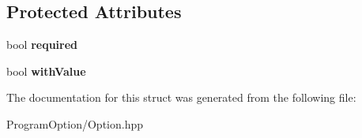 \subsection*{Protected Attributes}
\begin{DoxyCompactItemize}
\item 
\mbox{\label{structts_1_1_option_a37a2229e1048b8f8f2acc9f72990f00f}} 
bool {\bfseries required}
\item 
\mbox{\label{structts_1_1_option_affdb2491c28f14eaf43c50b2f674a676}} 
bool {\bfseries with\+Value}
\end{DoxyCompactItemize}


The documentation for this struct was generated from the following file\+:\begin{DoxyCompactItemize}
\item 
Program\+Option/Option.\+hpp\end{DoxyCompactItemize}
